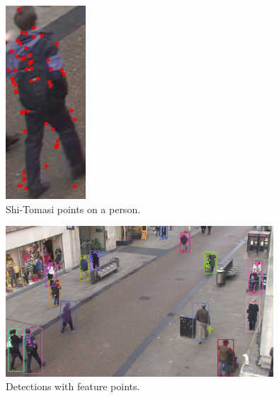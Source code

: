 \begin{figure}[H]
\centering         
\includegraphics[width=3cm]{implementation/pointsEQU.jpg}
\caption{Shi-Tomasi points on a person.} \label{solution2}
\end{figure}

%


\begin{figure}[H]
\centering         
\includegraphics[width=10cm]{intro/pounts.jpg}
\caption{Detections with feature points.} \label{solution3}
\end{figure}

